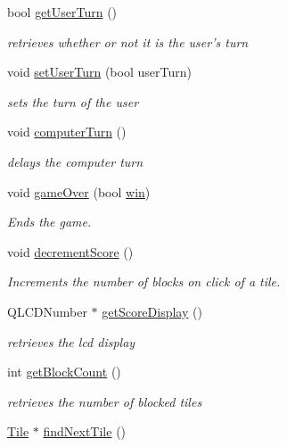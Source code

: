 \begin{DoxyCompactItemize}
bool \hyperlink{classGame2Scene_a7da54792cb9b5c90fd0ba55ab3806be8}{get\-User\-Turn} ()
\begin{DoxyCompactList}\small\item\em retrieves whether or not it is the user's turn \end{DoxyCompactList}\item 
void \hyperlink{classGame2Scene_ad0bee4e6175c046ea2cf7e96efaf86bf}{set\-User\-Turn} (bool user\-Turn)
\begin{DoxyCompactList}\small\item\em sets the turn of the user \end{DoxyCompactList}\item 
void \hyperlink{classGame2Scene_a6cc2a61e06a7c9ed0161dea7994c46cf}{computer\-Turn} ()
\begin{DoxyCompactList}\small\item\em delays the computer turn \end{DoxyCompactList}\item 
void \hyperlink{classGame2Scene_aaabae77c7589656966025ee6b4b3b6de}{game\-Over} (bool \hyperlink{classGame2Scene_ac67be84c6e44a47a4c6cfb914e6ad8b4}{win})
\begin{DoxyCompactList}\small\item\em \-Ends the game. \end{DoxyCompactList}\item 
void \hyperlink{classGame2Scene_a87cbb8341cd337cafc786ac377b6cc15}{decrement\-Score} ()
\begin{DoxyCompactList}\small\item\em \-Increments the number of blocks on click of a tile. \end{DoxyCompactList}\item 
\-Q\-L\-C\-D\-Number $\ast$ \hyperlink{classGame2Scene_a56438bf6f4bbee1c869eae94bca46d03}{get\-Score\-Display} ()
\begin{DoxyCompactList}\small\item\em retrieves the lcd display \end{DoxyCompactList}\item 
int \hyperlink{classGame2Scene_a76a2b32e9c93f1f88fa1b8b2fe87f04c}{get\-Block\-Count} ()
\begin{DoxyCompactList}\small\item\em retrieves the number of blocked tiles \end{DoxyCompactList}\item 
\hypertarget{classGame2Scene_ad38fb186d4d71eb1f5043a9f3486d8b4}{\hyperlink{classTile}{\-Tile} $\ast$ \hyperlink{classGame2Scene_ad38fb186d4d71eb1f5043a9f3486d8b4}{find\-Next\-Tile} ()}\label{classGame2Scene_ad38fb186d4d71eb1f5043a9f3486d8b4}


\end{DoxyCompactItemize}
